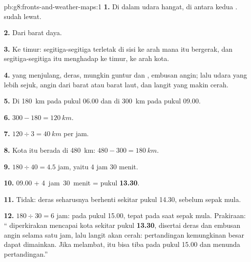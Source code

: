 \begin{solution}{pb:g8:fronts-and-weather-maps:1}
\textbf{1.} Di dalam udara hangat, di antara kedua . 
sudah lewat.

\textbf{2.} Dari barat daya.

\textbf{3.} Ke timur: segitiga-segitiga  terletak di sisi ke
arah mana  itu bergerak, dan segitiga-segitiga itu menghadap ke
timur, ke arah kota.

\textbf{4.}  yang menjulang,  deras, mungkin guntur dan ,
embusan angin; lalu udara yang lebih sejuk, angin dari barat atau barat
laut, dan langit yang makin cerah.

\textbf{5.} Di \qty{180}{km} pada pukul 06.00 dan di \qty{300}{km} pada pukul 09.00.

\textbf{6.} $300 - 180 = \qty{120}{km}$.

\textbf{7.} $120 \div 3 = \qty{40}{km}$ per jam.

\textbf{8.} Kota itu berada di \qty{480}{km}: $480 - 300 = \qty{180}{km}$.

\textbf{9.} $180 \div 40 = 4.5$ jam, yaitu 4 jam 30 menit.

\textbf{10.} 09.00 + 4~jam~30~menit = pukul \textbf{13.30}.

\textbf{11.} Tidak:  deras seharusnya berhenti sekitar pukul 14.30,
sebelum sepak mula.

\textbf{12.} $180 \div 30 = 6$ jam: pada pukul 15.00, tepat pada saat
sepak mula. Prakiraan: `` diperkirakan mencapai kota sekitar
pukul \textbf{13.30}, disertai  deras dan embusan angin selama satu
jam, lalu langit akan cerah: pertandingan kemungkinan besar dapat
dimainkan. Jika  melambat,  itu bisa tiba pada pukul 15.00 dan
menunda pertandingan.''
\end{solution}
